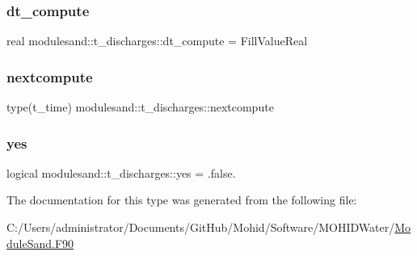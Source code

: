\subsubsection{\texorpdfstring{dt\+\_\+compute}{dt\_compute}}
{\footnotesize\ttfamily real modulesand\+::t\+\_\+discharges\+::dt\+\_\+compute = Fill\+Value\+Real\hspace{0.3cm}{\ttfamily [private]}}

\mbox{\label{structmodulesand_1_1t__discharges_acc5aea8e899e04f1343585d0e9e128bd}} 
\subsubsection{\texorpdfstring{nextcompute}{nextcompute}}
{\footnotesize\ttfamily type(t\+\_\+time) modulesand\+::t\+\_\+discharges\+::nextcompute\hspace{0.3cm}{\ttfamily [private]}}

\mbox{\label{structmodulesand_1_1t__discharges_a35ef496665f200306b5a50f2c80f2248}} 
\subsubsection{\texorpdfstring{yes}{yes}}
{\footnotesize\ttfamily logical modulesand\+::t\+\_\+discharges\+::yes = .false.\hspace{0.3cm}{\ttfamily [private]}}



The documentation for this type was generated from the following file\+:\begin{DoxyCompactItemize}
\item 
C\+:/\+Users/administrator/\+Documents/\+Git\+Hub/\+Mohid/\+Software/\+M\+O\+H\+I\+D\+Water/\mbox{\hyperlink{_module_sand_8_f90}{Module\+Sand.\+F90}}\end{DoxyCompactItemize}
